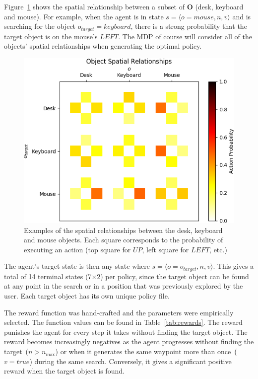 \documentclass[a4paper, twoside]{article}
\begin{document}
Figure~\ref{fig:obj-relationships} shows the spatial relationship between a subset of $\mathbf{O}$ (desk, keyboard and mouse). For example, when the agent is in state ${s=\langle o=mouse, n, v \rangle}$ and is searching for the object $o_{target} = keyboard$, there is a strong probability that the target object is on the mouse's $LEFT$. The MDP of course will consider all of the objects' spatial relationships when generating the optimal policy.

\begin{figure}
  \centering
  \includegraphics[width=\columnwidth]{../figures/object_relationships.png}
  \caption{Examples of the spatial relationships between the desk, keyboard and mouse objects. Each square corresponds to the probability of executing an action (top square for $UP$, left square for $LEFT$, etc.)}\label{fig:obj-relationships}
\end{figure}

The agent's target state is then any state where ${s = \langle o=o_{target}, n, v \rangle}$. This gives a total of 14 terminal states (7$\times$2) per policy, since the target object can be found at any point in the search or in a position that was previously explored by the user. Each target object has its own unique policy file.

The reward function was hand-crafted and the parameters were empirically selected. The function values can be found in Table~\ref{tab:rewards}. The reward punishes the agent for every step it takes without finding the target object. The reward becomes increasingly negatives as the agent progresses without finding the target~($n > n_{\max}$) or when it generates the same waypoint more than once~($v = true$) during the same search. Conversely, it gives a significant positive reward when the target object is found. 
\end{document}
